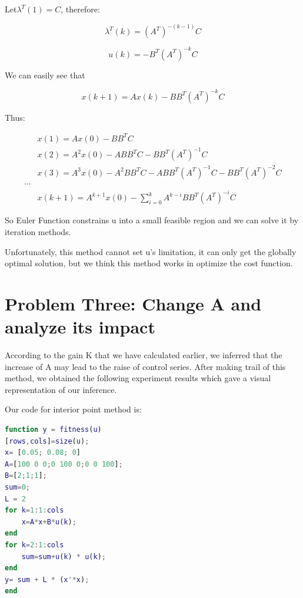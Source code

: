 \documentclass{mcmthesis}
\begin{document}
Let$\lambda^T(1)=C$, therefore:

 $$\lambda^T(k)=(A^T)^{-(k-1)}C$$

$$u(k)=-B^T(A^T)^{-k}C$$

We can easily see that

$$x(k+1)=Ax(k)-BB^T(A^T)^{-k}C$$

Thus:

\begin{align}
&x(1)=A x(0)-B B^{T} C \\
&x(2)=A^{2} x(0)-A B B^{T} C-B B^{T}\left(A^{T}\right)^{-1} C \\
&x(3)=A^{3} x(0)-A^{2} B B^{T} C-A B B^{T}\left(A^{T}\right)^{-1} C-B B^{T}\left(A^{T}\right)^{-2} C \\
\cdots \\
& x(k+1)=A^{k+1} x(0)-\sum_{i=0}^{k} A^{k-i} B B^{T}\left(A^{T}\right)^{-i} C
\end{align}

So Euler Function constrains u into a small  feasible region and we can solve it by iteration methods.

Unfortunately, this method cannot set u's limitation, it can only get the globally optimal solution, but we think this method works in optimize the cost function.


\section{Problem Three: Change A and analyze its impact}
According to the gain K that we have calculated earlier, we inferred that the increase of A may lead to the raise of control series. After making trail of this method, we obtained the following experiment results which gave a visual representation of our inference.\cite{MatthewGSmith:2005:GPEM}\cite{conf/smc/NetoFR13}

Our code for interior point method is:

\begin{lstlisting}[language=MATLAB, caption=Function for interior point method]
function y = fitness(u)
[rows,cols]=size(u);
x= [0.05; 0.08; 0]
A=[100 0 0;0 100 0;0 0 100];
B=[2;1;1];
sum=0;
L = 2
for k=1:1:cols
    x=A*x+B*u(k);
end
for k=2:1:cols
    sum=sum+u(k) * u(k);
end
y= sum + L * (x'*x);
end
\end{lstlisting}
\end{document}
